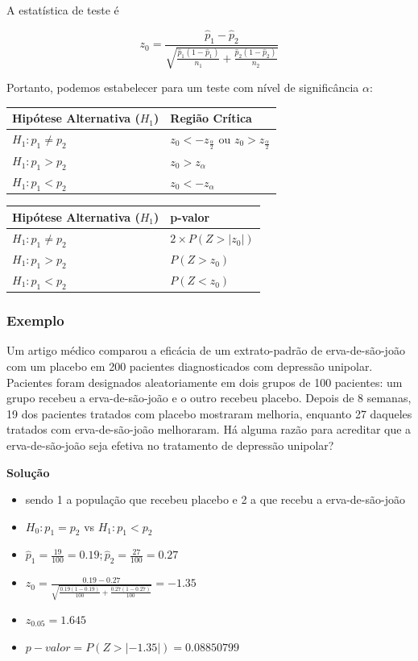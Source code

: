 \documentclass[
]{book}
\providecommand{\tightlist}{%
  \setlength{\itemsep}{0pt}\setlength{\parskip}{0pt}}
\begin{document}
A estatística de teste é

\[z_0=\frac{\hat p_1-\hat p_2}{\sqrt{\frac{\hat p_1(1-\hat p_1)}{n_1}+\frac{\hat p_2(1-\hat p_2)}{n_2}}}\]

Portanto, podemos estabelecer para um teste com nível de significância \(\alpha\):

\begin{longtable}[]{@{}ll@{}}
\toprule
Hipótese Alternativa (\(H_1\)) & Região Crítica \\
\midrule
\endhead
\(H_1: p_1\ne p_2\) & \(z_0<-z_{\frac{\alpha}{2}}\) ou \(z_0>z_{\frac{\alpha}{2}}\) \\
\(H_1: p_1>p_2\) & \(z_0>z_{\alpha}\) \\
\(H_1: p_1<p_2\) & \(z_0<-z_{\alpha}\) \\
\bottomrule
\end{longtable}

\begin{longtable}[]{@{}ll@{}}
\toprule
Hipótese Alternativa (\(H_1\)) & p-valor \\
\midrule
\endhead
\(H_1: p_1\ne p_2\) & \(2\times P(Z>|z_0|)\) \\
\(H_1: p_1>p_2\) & \(P(Z>z_0)\) \\
\(H_1: p_1<p_2\) & \(P(Z<z_0)\) \\
\bottomrule
\end{longtable}

\hypertarget{exemplo-17}{%
\subsubsection{Exemplo}\label{exemplo-17}}

Um artigo médico comparou a eficácia de um extrato-padrão de erva-de-são-joão com um placebo em 200 pacientes diagnosticados com depressão unipolar. Pacientes foram designados aleatoriamente em dois grupos de 100 pacientes: um grupo recebeu a erva-de-são-joão e o outro recebeu placebo. Depois de 8 semanas, 19 dos pacientes tratados com placebo mostraram melhoria, enquanto 27 daqueles tratados com erva-de-são-joão melhoraram. Há alguma razão para acreditar que a erva-de-são-joão seja efetiva no tratamento de depressão unipolar?

\textbf{Solução}

\begin{itemize}
\tightlist
\item
  sendo 1 a população que recebeu placebo e 2 a que recebu a erva-de-são-joão
\item
  \(H_0: p_1=p_2\) vs \(H_1: p_1 < p_2\)
\item
  \(\hat p_1=\frac{19}{100}=0.19; \hat p_2=\frac{27}{100}=0.27\)
\item
  \(z_0=\frac{0.19-0.27}{\sqrt{\frac{0.19(1-0.19)}{100}+\frac{0.27(1-0.27)}{100}}}=-1.35\)
\item
  \(z_{0.05}=1.645\)
\item
  \(p-valor= P(Z>|-1.35|)=0.08850799\)
\end{itemize}
\end{document}
